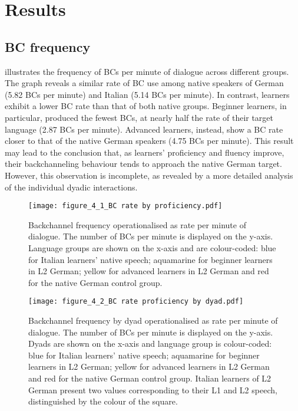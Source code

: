 \section{Results}
\label{sec:4.3}
\subsection{BC frequency}
\label{sec:4.3.1}

 illustrates the frequency of BCs per minute of dialogue across different groups. The graph reveals a similar rate of BC use among native speakers of German (5.82 BCs per minute) and Italian (5.14 BCs per minute). In contrast, learners exhibit a lower BC rate than that of both native groups. Beginner learners, in particular, produced the fewest BCs, at nearly half the rate of their target language (2.87 BCs per minute). Advanced learners, instead, show a BC rate closer to that of the native German speakers (4.75 BCs per minute). This result may lead to the conclusion that, as learners' proficiency and fluency improve, their backchanneling behaviour tends to approach the native German target. However, this observation is incomplete, as revealed by a more detailed analysis of the individual dyadic interactions.

\begin{figure}[p]
\texttt{[image: figure\_4\_1\_BC rate by proficiency.pdf]}
\caption{Backchannel frequency operationalised as rate per minute of dialogue. The number of BCs per minute is displayed on the y-axis. Language groups are shown on the x-axis and are colour-coded: blue for Italian learners’ native speech; aquamarine for beginner learners in L2 German; yellow for advanced learners in L2 German and red for the native German control group.}
\label{fig:4.1}
\end{figure}

\begin{figure}[p]
\texttt{[image: figure\_4\_2\_BC rate proficiency by dyad.pdf]}
\caption{Backchannel frequency by dyad operationalised as rate per minute of dialogue. The number of BCs per minute is displayed on the y-axis. Dyads are shown on the x-axis and language group is colour-coded: blue for Italian learners’ native speech; aquamarine for beginner learners in L2 German; yellow for advanced learners in L2 German and red for the native German control group. Italian learners of L2 German present two values corresponding to their L1 and L2 speech, distinguished by the colour of the square.}
\label{fig:4.2}
\end{figure}

